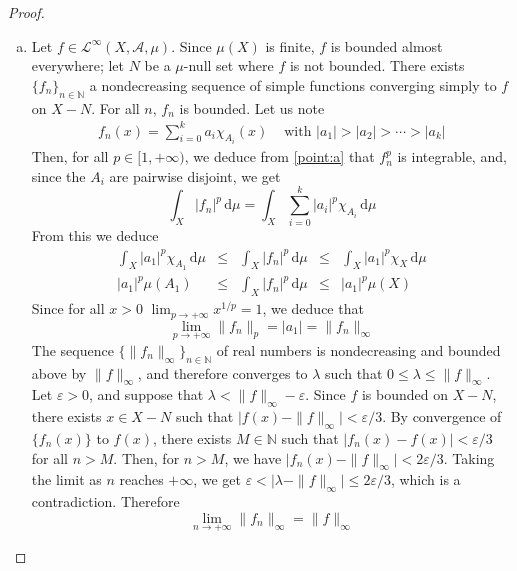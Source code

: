 \documentclass[11pt,a4paper,twoside]{article}
\theoremstyle{definition}
\begin{document}
\begin{proof}
\begin{enumerate}[(a)]
  \item Let $f \in \mathscr{L}^\infty ( X, \mathscr{A}, \mu )$. Since $\mu (X)$ is finite, $f$ is bounded almost everywhere; let $N$
    be a $\mu$-null set where $f$ is not bounded. There exists $\{ f_n \}_{n \in \mathbb{N}}$ a nondecreasing sequence of simple functions
    converging simply to $f$ on $X - N$. For all $n$, $f_n$ is bounded. Let us note
    \begin{align*}
      f_n (x) = \sum_{i = 0}^k a_{i} \chi_{A_i} (x) &\text{ with } | a_1 | > | a_2 | > \dotsb > | a_k |
    \end{align*}
    Then, for all $p \in [1, {+\infty})$, we deduce from \ref{point:a} that $f_n^p$ is integrable, and, since the $A_i$ are pairwise disjoint, we get
    \begin{equation*}
      \int_X | f_n |^p \,\mathrm{d}\mu = \int_X \sum_{i = 0}^k | a_i |^p \chi_{A_i} \,\mathrm{d}\mu
    \end{equation*}
    From this we deduce
    \begin{align*}
      \int_X | a_1 |^p \chi_{A_1} \,\mathrm{d}\mu &\leq& \int_X | f_n |^p \,\mathrm{d}\mu &\leq& \int_X | a_1 |^p \chi_X \,\mathrm{d}\mu \\
      | a_1 |^p \mu ( A_1 ) &\leq& \int_X | f_n |^p \,\mathrm{d}\mu &\leq& | a_1 |^p \mu (X)
    \end{align*}
    Since for all $x > 0$ $\lim_{p \to +\infty} x^{1 / p} = 1$, we deduce that
    \begin{equation} \label{eq:fn_p_fn_infty}
      \lim_{p \to +\infty} \| f_n \|_p = | a_1 | = \| f_n \|_\infty
    \end{equation}
    The sequence $\{ \| f_n \|_\infty \}_{n \in \mathbb{N}}$ of real numbers is nondecreasing and bounded above by $\| f \|_\infty$, and therefore converges
    to $\lambda$ such that $0 \leq \lambda \leq \| f \|_\infty$. Let $\varepsilon > 0$, and suppose that $\lambda < \| f \|_\infty - \varepsilon$.
    Since $f$ is bounded on $X - N$, there exists $x \in X - N$ such that $\big| f (x) - \| f \|_\infty \big| < \varepsilon / 3$.
    By convergence of $\{ f_n (x) \}$ to $f (x)$, there exists $M \in \mathbb{N}$ such that $| f_n (x) - f (x) | < \varepsilon / 3$ for all $n > M$.
    Then, for $n > M$, we have $\big| f_n (x) - \| f \|_\infty \big| < 2 \varepsilon / 3$. Taking the limit as $n$ reaches $+\infty$, we get
    $\varepsilon < \big| \lambda - \| f \|_\infty \big| \leq 2 \varepsilon / 3$, which is a contradiction. Therefore
    \begin{equation} \label{eq:fn_infty_f_infty}
      \lim_{n \to +\infty} \| f_n \|_\infty = \| f \|_\infty
    \end{equation}


\end{enumerate}
\end{proof}
\end{document}
